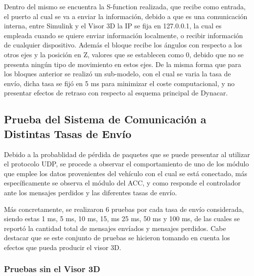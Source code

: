 \par Dentro del mismo se encuentra la S-function realizada, que recibe como entrada, el puerto al cual se va a enviar la información, debido a que es una comunicación interna, entre Simulink y el Visor 3D la IP se fija en 127.0.0.1, la cual es empleada cuando se quiere enviar información localmente, o recibir información de cualquier dispositivo. Además el bloque recibe los ángulos con respecto a los otros ejes y la posición en Z, valores que se establecen como 0, debido que no se presenta ningún tipo de movimiento en estos ejes. De la misma forma que para los bloques anterior se realizó un sub-modelo, con el cual se varia la tasa de envío, dicha tasa se fijó en 5 ms para minimizar el coste computacional, y no presentar efectos de retraso con respecto al esquema principal de Dynacar.  

\subsection{Prueba del Sistema de Comunicación a Distintas Tasas de Envío}

Debido a la probablidad de pérdida de paquetes que se puede presentar al utilizar el protocolo UDP, se procede a observar el comportamiento de uno de los módulo que emplee los datos provenientes del vehículo con el cual se está conectado, más específicamente se observa el módulo del ACC, y como responde el controlador ante los mensajes perdidos y las diferentes tasas de envío.\\
 \par Más concretamente, se realizaron 6 pruebas por cada tasa de envío considerada, siendo estas 1 ms, 5 ms, 10 ms, 15, ms 25 ms, 50 ms y 100 ms, de las cuales se reportó la cantidad total de mensajes envíados y mensajes perdidos. Cabe destacar que se este conjunto de pruebas se hicieron tomando en cuenta los efectos que pueda producir el visor 3D.
\subsubsection{Pruebas sin el Visor 3D}  

